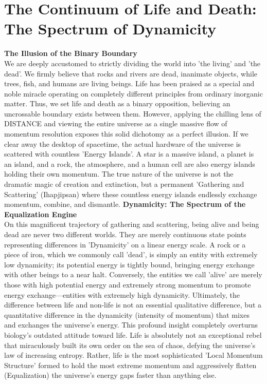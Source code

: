 

\section{The Continuum of Life and Death: The Spectrum of Dynamicity}
\textbf{The Illusion of the Binary Boundary} \\
We are deeply accustomed to strictly dividing the world into 'the living' and 'the dead'. We firmly believe that rocks and rivers are dead, inanimate objects, while trees, fish, and humans are living beings. Life has been praised as a special and noble miracle operating on completely different principles from ordinary inorganic matter. Thus, we set life and death as a binary opposition, believing an uncrossable boundary exists between them. However, applying the chilling lens of DISTANCE and viewing the entire universe as a single massive flow of momentum resolution exposes this solid dichotomy as a perfect illusion.
If we clear away the desktop of spacetime, the actual hardware of the universe is scattered with countless 'Energy Islands'. A star is a massive island, a planet is an island, and a rock, the atmosphere, and a human cell are also energy islands holding their own momentum. The true nature of the universe is not the dramatic magic of creation and extinction, but a permanent 'Gathering and Scattering' (Ihapjipsan) where these countless energy islands endlessly exchange momentum, combine, and dismantle.
\textbf{Dynamicity: The Spectrum of the Equalization Engine} \\
On this magnificent trajectory of gathering and scattering, being alive and being dead are never two different worlds. They are merely continuous state points representing differences in 'Dynamicity' on a linear energy scale.
A rock or a piece of iron, which we commonly call 'dead', is simply an entity with extremely low dynamicity; its potential energy is tightly bound, bringing energy exchange with other beings to a near halt. Conversely, the entities we call 'alive' are merely those with high potential energy and extremely strong momentum to promote energy exchange—entities with extremely high dynamicity. Ultimately, the difference between life and non-life is not an essential qualitative difference, but a quantitative difference in the dynamicity (intensity of momentum) that mixes and exchanges the universe's energy.
This profound insight completely overturns biology's outdated attitude toward life. Life is absolutely not an exceptional rebel that miraculously built its own order on the sea of chaos, defying the universe's law of increasing entropy. Rather, life is the most sophisticated 'Local Momentum Structure' formed to hold the most extreme momentum and aggressively flatten (Equalization) the universe's energy gaps faster than anything else.
